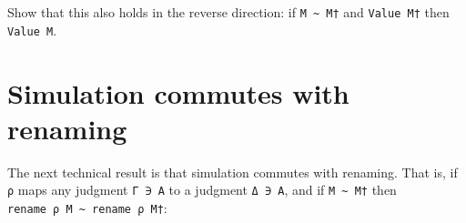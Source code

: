 Show that this also holds in the reverse direction: if
\texttt{M\ \textasciitilde{}\ M†} and \texttt{Value\ M†} then
\texttt{Value\ M}.

\begin{fence}
\begin{code}%
\>[0]\<%
\end{code}
\end{fence}

\hypertarget{simulation-commutes-with-renaming}{%
\section{Simulation commutes with
renaming}\label{simulation-commutes-with-renaming}}

The next technical result is that simulation commutes with renaming.
That is, if \texttt{ρ} maps any judgment \texttt{Γ\ ∋\ A} to a judgment
\texttt{Δ\ ∋\ A}, and if \texttt{M\ \textasciitilde{}\ M†} then
\texttt{rename\ ρ\ M\ \textasciitilde{}\ rename\ ρ\ M†}:

